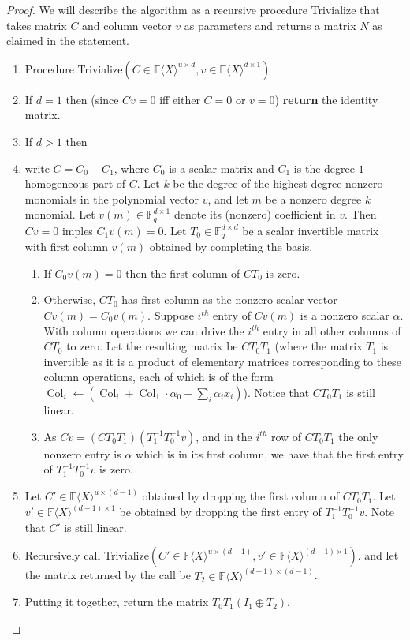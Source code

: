 \documentclass[10pt,a4paper]{article}
\DeclareMathOperator{\col}{Col}
\newcommand{\F}{\mathbb{F}}
\renewcommand{\angle}[1]{\langle #1 \rangle}
\newcommand{\FX}{\F\angle{X}}
\newcommand{\fR}{\FX}
\begin{document}
\begin{proof}
 We will describe the algorithm as a recursive procedure Trivialize
 that takes matrix $C$ and column vector $v$ as parameters and returns
 a matrix $N$ as claimed in the statement.

  \begin{enumerate}
  \item[] Procedure Trivialize$(C\in\fR^{u\times d},v\in\fR^{d\times 1})$
  \item If $d=1$ then (since $Cv=0$ iff either $C=0$ or $v=0$)
    \textbf{return} the identity matrix.
  \item  If $d>1$ then
  \item write $C=C_0+C_1$, where $C_0$ is a scalar matrix and $C_1$ is the
    degree $1$ homogeneous part of $C$. Let $k$ be the degree of the
    highest degree nonzero monomials in the polynomial vector $v$, and
    let $m$ be a nonzero degree $k$ monomial. Let
    $v(m)\in\F_q^{d\times 1}$ denote its (nonzero) coefficient in $v$.
    Then $Cv=0$ imples $C_1 v(m)=0$. Let $T_0\in\F_q^{d\times d}$ be a
    scalar invertible matrix with first column $v(m)$ obtained by
    completing the basis.
    \begin{enumerate}
    \item If $C_0v(m)=0$ then the first column of $CT_0$ is zero.
    \item Otherwise, $CT_0$ has first column as the nonzero scalar
      vector $Cv(m)=C_0v(m)$. Suppose $i^{th}$ entry of $Cv(m)$ is a
      nonzero scalar $\alpha$. With column operations we can drive the
      $i^{th}$ entry in all other columns of $CT_0$ to zero. Let the
      resulting matrix be $CT_0T_1$ (where the matrix $T_1$ is
      invertible as it is a product of elementary matrices
      corresponding to these column operations, each of which is of
      the form $\col_i\leftarrow (\col_i +
      \col_1\cdot \alpha_0+\sum_i \alpha_i x_i)$). Notice that $CT_0T_1$ is still
      linear.
    \item As $Cv=(CT_0T_1)(T_1^{-1}T_0^{-1}v)$, and in the $i^{th}$
      row of $CT_0T_1$ the only nonzero entry is $\alpha$ which is in
      its first column, we have that the first entry of
      $T_1^{-1}T_0^{-1}v$ is zero.
    \end{enumerate}
  \item Let $C'\in\fR^{u\times (d-1)}$ obtained by dropping the first
    column of $CT_0T_1$. Let $v'\in\fR^{(d-1)\times 1}$ be obtained by
    dropping the first entry of $T_1^{-1}T_0^{-1}v$. Note that $C'$
    is still linear.
  \item Recursively call Trivialize$(C'\in\fR^{u\times
    (d-1)},v'\in\fR^{(d-1)\times 1})$.  and let the matrix returned by
    the call be $T_2\in\fR^{(d-1)\times (d-1)}$.
  \item Putting it together, return the matrix $T_0T_1(I_1\oplus T_2)$.
  \end{enumerate}


\end{proof}
\end{document}
